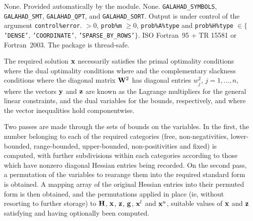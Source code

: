 \documentclass{galahad}
\begin{document}
\galgeneral

\galcommon None.
\galworkspace Provided automatically by the module.
\galroutines None.
\galmodules
{\tt GALAHAD\_SY\-M\-BOLS},
{\tt GALAHAD\_SMT},
{\tt GALAHAD\_QPT},
and {\tt GALAHAD\_SORT}.
\galio Output is under control of the argument {\tt control\%error}.
 $> 0$, {\tt prob\%m} $\geq  0$,
{\tt prob\%A\%type} and {\tt prob\%H\%type} $\in \{${\tt 'DENSE'},
 {\tt 'COORDINATE'}, {\tt 'SPARSE\_BY\_ROWS'}$\}$.
\galportability ISO Fortran~95 + TR 15581 or Fortran~2003. The package is thread-safe.


\galmethod
The required solution ${\mathbf{x}}$ necessarily satisfies
the primal optimality conditions
where
the dual optimality conditions
where
and the complementary slackness conditions
where the diagonal matrix ${\mathbf{W}}^{2}$ has diagonal entries $w_{j}^{2}$,
$j = 1, \ldots , n$, where the vectors ${\mathbf{y}}$ and ${\mathbf{z}}$ are
known as the Lagrange multipliers for
the general linear constraints, and the dual variables for the bounds,
respectively, and where the vector inequalities hold componentwise.

Two passes are made through the sets of bounds on the variables.
In the first, the number belonging to each of the required categories
(free, non-negativities, lower-bounded, range-bounded,
upper-bounded, non-positivities and fixed) is computed, with further
subdivisions within each categories according to those which have
nonzero diagonal Hessian entries being recorded. On the second pass, a
permutation of the variables to rearange them into the required standard form
is obtained. A mapping array of the original Hessian entries into their
permuted form is then obtained, and the permutations applied in place
(ie, without resorting to further storage) to ${\mathbf{H}}$, ${\mathbf{x}}$, ${\mathbf{z}}$, ${\mathbf{g}}$,
${\mathbf{x}}^l$ and ${\mathbf{x}}^u$, suitable values of ${\mathbf{x}}$ and ${\mathbf{z}}$
satisfying  and  having optionally been computed.
\end{document}
